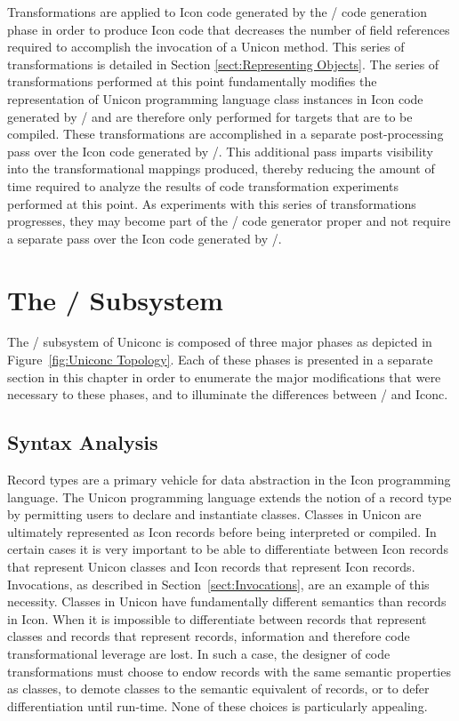 Transformations are applied to Icon code generated by the \Ut/ code
generation phase in order to produce Icon code that decreases the
number of field references required to accomplish the invocation of a
Unicon method. This series of transformations is detailed in Section
\ref{sect:Representing Objects}. The series of transformations
performed at this point fundamentally modifies the representation of
Unicon programming language class instances in Icon code generated by
\Ut/ and are therefore only performed for targets that are to be
compiled. These transformations are accomplished in a separate
post-processing pass over the Icon code generated by \Ut/. This
additional pass imparts visibility into the transformational mappings
produced, thereby reducing the amount of time required to analyze the
results of code transformation experiments performed at this point. As
experiments with this series of transformations progresses, they may
become part of the \Ut/ code generator proper and not require a
separate pass over the Icon code generated by \Ut/.

\section{The \IC/ Subsystem}

The \Ic/ subsystem of Uniconc is composed of three major phases as
depicted in Figure~\ref{fig:Uniconc Topology}. Each of these phases is
presented in a separate section in this chapter in order to enumerate
the major modifications that were necessary to these phases, and to
illuminate the differences between \Ic/ and Iconc.

\subsection{Syntax Analysis}
\label{sect:Recs v Objs}
Record types are a primary vehicle for data abstraction in the Icon programming
language. The Unicon programming language extends the notion of a record type by
permitting users to declare and instantiate classes. Classes in Unicon
are ultimately represented as Icon records before being
interpreted or compiled. In certain cases it is very important to be able to
differentiate between Icon records that represent Unicon classes and Icon
records that represent Icon records. Invocations, as described in
Section~\ref{sect:Invocations}, are an example of this necessity. Classes in
Unicon have fundamentally different semantics than records in Icon. When it is
impossible to differentiate between records that represent classes and records
that represent records, information and therefore code transformational leverage
are lost. In such a case, the designer of code transformations must choose to
endow records with the same semantic properties as classes, to demote classes to
the semantic equivalent of records, or to defer differentiation until \mbox{run-time}.
None of these choices is particularly appealing.

